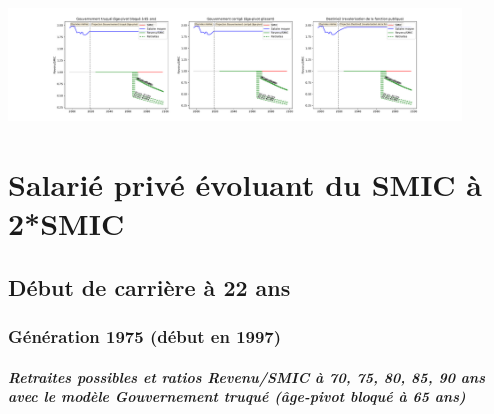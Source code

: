  \begin{center}\includegraphics[width=0.9\textwidth]{fig/SMIC_2003_22_dest_retraite.pdf}\end{center} \label{fig/SMIC_2003_22_dest_retraite.pdf} 

\newpage 
 
\chapter{Salarié privé évoluant du SMIC à 2*SMIC} 


 \addto{\captionsenglish}{ \renewcommand{\mtctitle}{}} \setcounter{minitocdepth}{2} 
 \minitoc \newpage 

\section{Début de carrière à 22 ans} 

\subsection{Génération 1975 (début en 1997)} 

\paragraph{Retraites possibles et ratios Revenu/SMIC à 70, 75, 80, 85, 90 ans avec le modèle \emph{Gouvernement truqué (âge-pivot bloqué à 65 ans)}}  
 
